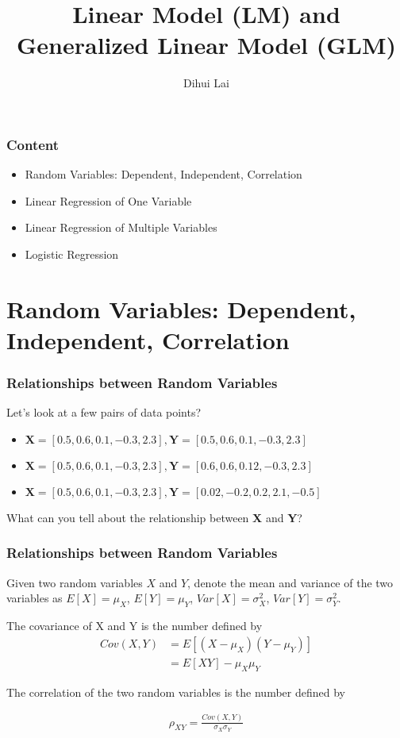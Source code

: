 \documentclass[notheorems, aspectratio=54]{beamer}
\title{Linear Model (LM) and Generalized Linear Model (GLM)}
\author{Dihui Lai}
\institute[WUSTL]{dlai@wustl.edu}
\begin{document}
\begin{frame}
    \titlepage
\end{frame}


\begin{frame}
\frametitle{Content}

\begin{itemize}
\item Random Variables: Dependent, Independent, Correlation 
\item Linear Regression of One Variable
\item Linear Regression of Multiple Variables
\item Logistic Regression
\end{itemize}
\end{frame}


\section{Random Variables: Dependent, Independent, Correlation }

\begin{frame}

\frametitle{Relationships between Random Variables}

Let's look at a few pairs of data  points?

\begin{itemize}
\item $\textbf{X}=[0.5, 0.6, 0.1, -0.3, 2.3], \textbf{Y}=[0.5, 0.6, 0.1, -0.3, 2.3]$
\item $\textbf{X}=[0.5, 0.6, 0.1, -0.3, 2.3], \textbf{Y}=[0.6, 0.6, 0.12, -0.3, 2.3]$
\item $\textbf{X}=[0.5, 0.6, 0.1, -0.3, 2.3], \textbf{Y}=[0.02, -0.2,0.2,2.1, -0.5]$
\end{itemize}

What can you tell about the relationship between \textbf{X} and \textbf{Y}?

\end{frame}

\begin{frame}
\frametitle{Relationships between Random Variables}
Given two random variables $X$ and $Y$, denote the mean and variance of the two variables as $E[X]=\mu_X$, $E[Y]=\mu_Y$, $Var[X]=\sigma^2_X$, $Var[Y]=\sigma^2_Y$.

The covariance of X and Y is the number defined by
\begin{align*}
Cov(X, Y)&=E[(X-\mu_X)(Y-\mu_Y)]\\
&=E[XY]-\mu_X \mu_Y
\end{align*}

The correlation of the two random variables is the number defined by 


\begin{align*}
\rho_{XY}=\frac{Cov(X,Y)}{\sigma_X \sigma_Y}
\end{align*}

\end{frame}
\end{document}
